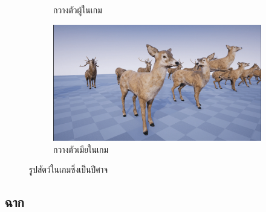 \begin{figure}[h]
\begin{subfigure}{0.4\textwidth}
    \caption[กวางตัวผู้ในเกม]{กวางตัวผู้ในเกม}
    \label{fig:deerstag}
  \end{subfigure}
  \hfil
  \begin{subfigure}{0.4\textwidth}
    \includegraphics[width=\textwidth]{./img/deerdoe.png}
    \caption[กวางตัวเมียในเกม]{กวางตัวเมียในเกม}
    \label{fig:deerdoe}
  \end{subfigure}
  \caption{รูปสัตว์ในเกมซึ่งเป็นปีศาจ}
  \label{fig:four animals}
\end{figure}




\subsection{ฉาก}

